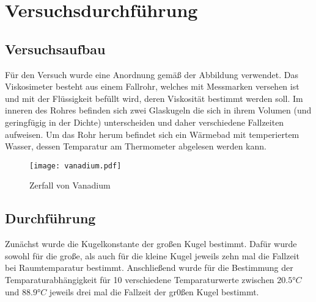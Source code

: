 \section{Versuchsdurchführung}
\label{sec:durchfuehrung}
\subsection{Versuchsaufbau}
\label{sec:aufbau}
Für den Versuch wurde eine Anordnung gemäß der Abbildung verwendet. Das Viskosimeter besteht aus einem Fallrohr, welches mit Messmarken versehen ist und mit der Flüssigkeit befüllt wird, deren Viskosität bestimmt werden soll. Im inneren des Rohres befinden sich zwei Glaskugeln die sich in ihrem Volumen (und geringfügig in der Dichte) unterscheiden und daher verschiedene Fallzeiten aufweisen. Um das Rohr herum befindet sich ein Wärmebad mit temperiertem Wasser, dessen Temparatur am Thermometer abgelesen werden kann. 

\begin{figure}
  \centering
  \texttt{[image: vanadium.pdf]} %
  \caption{Zerfall von Vanadium} %
  \label{fig:vanadium}
\end{figure}
\subsection{Durchführung}
Zunächst wurde die Kugelkonstante der großen Kugel bestimmt. Dafür wurde sowohl für die große, als auch für die kleine Kugel jeweils zehn mal die Fallzeit bei Raumtemparatur bestimmt. Anschließend wurde für die Bestimmung der Temparaturabhängigkeit für 10 verschiedene Temparaturwerte zwischen $20.5°C$ und $88.9°C$ jeweils drei mal die Fallzeit der gr0ßen Kugel bestimmt.
